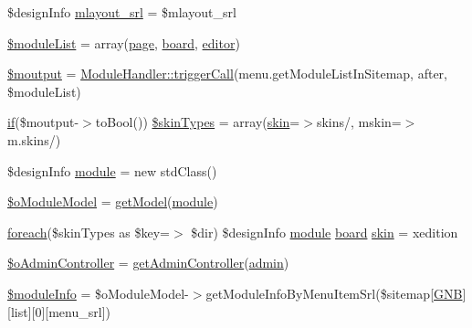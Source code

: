 \begin{DoxyCompactItemize}
\item 
\$design\+Info \hyperlink{ko_8install_8php_a9cf497537007b08c645bed35f564be54}{mlayout\+\_\+srl} = \$mlayout\+\_\+srl
\item 
\hyperlink{ko_8install_8php_aaa80946d50e2d3677fbbc6d6c8a643c3}{\$module\+List} = array(\textquotesingle{}\hyperlink{classpage}{page}\textquotesingle{}, \textquotesingle{}\hyperlink{classboard}{board}\textquotesingle{}, \textquotesingle{}\hyperlink{classeditor}{editor}\textquotesingle{})
\item 
\hyperlink{ko_8install_8php_a2598d068355cca17645bc6bd70cc3a8c}{\$moutput} = \hyperlink{classModuleHandler_aa1b1f9eae91ccd76e6a81c9375c2e673}{Module\+Handler\+::trigger\+Call}(\textquotesingle{}menu.\+get\+Module\+List\+In\+Sitemap\textquotesingle{}, \textquotesingle{}after\textquotesingle{}, \$module\+List)
\item 
\hyperlink{menu_2tpl_2js_2jquery_8jstree_8js_acba95bef569cfaee32c4ed0212b2bb92}{if}(\$moutput-\/$>$to\+Bool()) \hyperlink{ko_8install_8php_aa61073b7b359568eb3459da113fd8cdf}{\$skin\+Types} = array(\textquotesingle{}\hyperlink{ko_8install_8php_ab0f2b49fdb57754496b34f6b880cdeaf}{skin}\textquotesingle{}=$>$\textquotesingle{}skins/\textquotesingle{}, \textquotesingle{}mskin\textquotesingle{}=$>$\textquotesingle{}m.\+skins/\textquotesingle{})
\item 
\$design\+Info \hyperlink{ko_8install_8php_a5c3fc1968f94c2b6a7c60845f284de78}{module} = new std\+Class()
\item 
\hyperlink{ko_8install_8php_a8d7a87df524e7d6938f66f8e284cdd1e}{\$o\+Module\+Model} = \hyperlink{func_8inc_8php_aecdfcc5332bcf22df01fc21a03b64435}{get\+Model}(\textquotesingle{}\hyperlink{classmodule}{module}\textquotesingle{})
\item 
\hyperlink{ReadMe_8txt_a78ed9bdcd90fd96af66d03ef8b32649c}{foreach}(\$skin\+Types as \$key=$>$ \$dir) \$design\+Info \hyperlink{classmodule}{module} \hyperlink{classboard}{board} \hyperlink{ko_8install_8php_ab0f2b49fdb57754496b34f6b880cdeaf}{skin} = \textquotesingle{}xedition\textquotesingle{}
\item 
\hyperlink{ko_8install_8php_a52d90466dc7adee7d324b3ef032b8167}{\$o\+Admin\+Controller} = \hyperlink{func_8inc_8php_a2f7ca88a5226536aca3b2f5682bd7b2d}{get\+Admin\+Controller}(\textquotesingle{}\hyperlink{classadmin}{admin}\textquotesingle{})
\item 
\hyperlink{ko_8install_8php_ae3552a6dd49f37a50e7858151f7c5cc2}{\$module\+Info} = \$o\+Module\+Model-\/$>$get\+Module\+Info\+By\+Menu\+Item\+Srl(\$sitemap\mbox{[}\textquotesingle{}\hyperlink{ko_8install_8php_a9b1716b68fc04f3492448f38148dcbf5}{G\+NB}\textquotesingle{}\mbox{]}\mbox{[}\textquotesingle{}list\textquotesingle{}\mbox{]}\mbox{[}0\mbox{]}\mbox{[}\textquotesingle{}menu\+\_\+srl\textquotesingle{}\mbox{]})

\end{DoxyCompactItemize}
